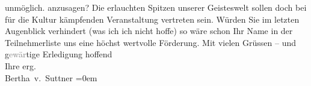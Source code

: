 \begin{ledgroupsized}[t]{13cm}
{{{                        unmöglich.}}}\label{K_L02179_1h} anzusagen? Die erlauchten Spitzen unserer Geisteswelt
                    sollen doch bei für die Kultur kämpfenden Veranstaltung
                    vertreten sein.\pend
           \pstart
           Würden Sie im letzten Augenblick verhindert (was ich ich nicht hoffe) so wäre
                    schon Ihr Name in der Teilnehmerliste uns eine höchst wertvolle Förderung.\pend
           \pstart
           Mit vielen Grüssen – und g\textcolor{gray}{ewär}tige Erledigung
                    hoffend{\\[\baselineskip]}Ihre erg.{\\[\baselineskip]}\spacefill\mbox{Bertha v. Suttner}\pend
           \leftskip=0em{}          \endnumbering{}\end{ledgroupsized}  \newcommand{\dateiname}{L02179}\newcommand{\titel}{Bertha von Suttner an Arthur und Olga Schnitzler, 14. 5. 1914}\newcommand{\editorInnen}{Martin Anton Müller und Gerd-Hermann Susen}
            \footnotesize
\begin{ledgroupsized}[t]{11.5cm}
\end{ledgroupsized}
         
      